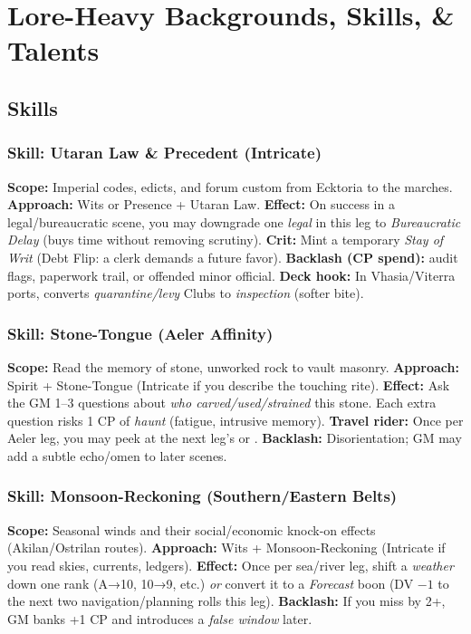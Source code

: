 \chapter{Lore-Heavy Backgrounds, Skills, \& Talents}

\section{Skills}

\subsection{Skill: Utaran Law \& Precedent (Intricate)}
\textbf{Scope:} Imperial codes, edicts, and forum custom from Ecktoria to the marches.
\textbf{Approach:} Wits or Presence + Utaran Law.
\textbf{Effect:} On success in a legal/bureaucratic scene, you may downgrade one \emph{legal} \SuitClub{} in this leg to \emph{Bureaucratic Delay} (buys time without removing scrutiny).
\textbf{Crit:} Mint a temporary \SuitDiamond{} \emph{Stay of Writ} (Debt Flip: a clerk demands a future favor).
\textbf{Backlash (CP spend):} audit flags, paperwork trail, or offended minor official.
\textbf{Deck hook:} In Vhasia/Viterra ports, converts \emph{quarantine/levy} Clubs to \emph{inspection} (softer bite).

\subsection{Skill: Stone-Tongue (Aeler Affinity)}
\textbf{Scope:} Read the memory of stone, unworked rock to vault masonry.
\textbf{Approach:} Spirit + Stone-Tongue (Intricate if you describe the touching rite).
\textbf{Effect:} Ask the GM 1--3 questions about \emph{who carved/used/strained} this stone. Each extra question risks 1 CP of \emph{haunt} (fatigue, intrusive memory).
\textbf{Travel rider:} Once per Aeler leg, you may peek at the next leg’s \SuitSpade{} or \SuitClub{}.
\textbf{Backlash:} Disorientation; GM may add a subtle echo/omen to later scenes.

\subsection{Skill: Monsoon-Reckoning (Southern/Eastern Belts)}
\textbf{Scope:} Seasonal winds and their social/economic knock-on effects (Akilan/Ostrilan routes).
\textbf{Approach:} Wits + Monsoon-Reckoning (Intricate if you read skies, currents, ledgers).
\textbf{Effect:} Once per sea/river leg, shift a \emph{weather} \SuitClub{} down one rank (A→10, 10→9, etc.) \emph{or} convert it to a \emph{Forecast} boon (DV $-1$ to the next two navigation/planning rolls this leg).
\textbf{Backlash:} If you miss by 2+, GM banks +1 CP and introduces a \emph{false window} later.

